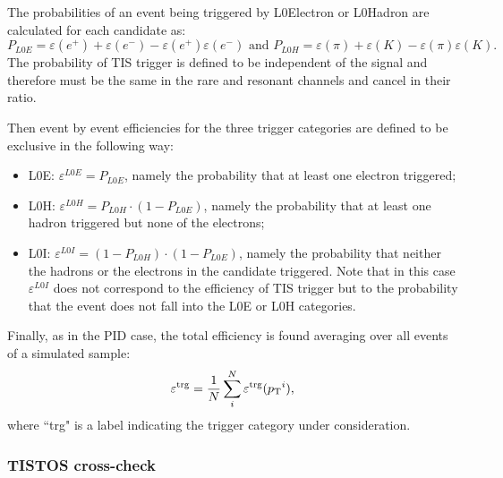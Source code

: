 The probabilities of an event being triggered by L0Electron or L0Hadron are calculated for each candidate as:
%
$$P_{L0E} = \varepsilon(e^+) + \varepsilon(e^-) - \varepsilon(e^+)\varepsilon(e^-) \text{ and }  
 P_{L0H} = \varepsilon(\pi) + \varepsilon(K) - \varepsilon(\pi)\varepsilon(K).$$
%
The probability of TIS trigger is defined to be independent of the signal and therefore must
be the same in the rare and resonant channels and cancel in their ratio.

Then event by event efficiencies for the three trigger categories are defined to be exclusive in the following way:
%
\begin{itemize}
\item L0E: $\varepsilon^{L0E} = P_{L0E}$, namely the probability that at least one electron triggered;
\item L0H: $\varepsilon^{L0H} = P_{L0H}\cdot(1 - P_{L0E})$, namely the probability that at least one hadron triggered but none of the electrons;
\item L0I: $\varepsilon^{L0I} = (1-P_{L0H})\cdot(1 - P_{L0E})$, namely the probability that neither the hadrons or the electrons in the candidate triggered. Note that in this case $\varepsilon^{L0I} $ does not correspond to the efficiency of TIS trigger but to the probability that the event does not fall into the L0E or L0H categories.
\end{itemize}
%
Finally, as in the PID case, the total efficiency is found averaging over all events of a simulated sample:
%
\begin{equation}
\varepsilon^{\rm trg} = \frac{1}{N} \sum_i^N \varepsilon^{\rm trg}(\mbox{$p_{\rm T}$}^i),
\end{equation}
\noindent
where ``trg" is a label indicating the trigger category under consideration.

\subsubsection{TISTOS cross-check}
\label{sec:tistos}

